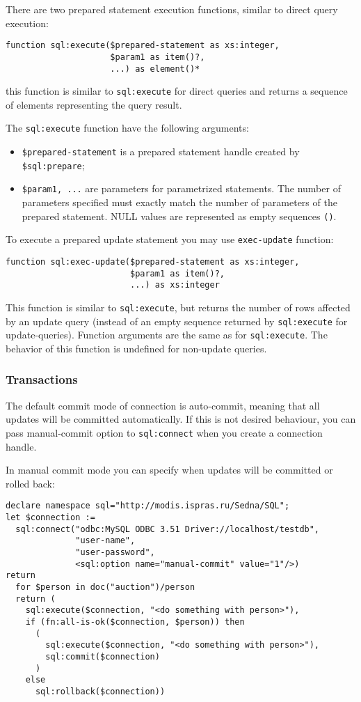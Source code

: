 \documentclass[a4paper,12pt]{article}
\newenvironment{citemize}
{\begin{itemize}
  \setlength{\itemsep}{0pt}
  \setlength{\parskip}{0pt}
  \setlength{\parsep}{0pt}}
{\end{itemize}}
\begin{document}
There are two prepared statement execution functions, similar to direct
query execution:

\begin{verbatim}
function sql:execute($prepared-statement as xs:integer,
                     $param1 as item()?,
                     ...) as element()*
\end{verbatim}
this function is similar to \verb!sql:execute! for direct queries and returns a
sequence of elements representing the query result.

The \verb!sql:execute! function have the following arguments:

\begin{citemize}
\item\verb!$prepared-statement! is a prepared statement handle created by
\verb!$sql:prepare!;
\item\verb!$param1, ...! are parameters for parametrized
statements. The number of parameters specified must exactly match the number
of parameters of the prepared statement. NULL values are represented as empty
sequences \verb!()!.
\end{citemize}

To execute a prepared update statement you may use \verb!exec-update! function:
\begin{verbatim}
function sql:exec-update($prepared-statement as xs:integer,
                         $param1 as item()?,
                         ...) as xs:integer
\end{verbatim}
This function is similar to \verb!sql:execute!, but returns the number of rows
affected by an update query (instead of an empty sequence returned by
\verb!sql:execute! for update-queries). Function arguments are the same as for
\verb!sql:execute!. The behavior of this function is undefined for non-update
queries.


\subsubsection*{Transactions}

The default commit mode of connection is auto-commit, meaning that all updates
will be committed automatically. If this is not desired behaviour, you can pass
manual-commit option to \verb!sql:connect! when you create a connection handle.

In manual commit mode you can specify when updates will be committed or rolled
back:

\small{
\begin{verbatim}
declare namespace sql="http://modis.ispras.ru/Sedna/SQL";
let $connection :=
  sql:connect("odbc:MySQL ODBC 3.51 Driver://localhost/testdb",
              "user-name",
              "user-password",
              <sql:option name="manual-commit" value="1"/>)
return
  for $person in doc("auction")/person
  return (
    sql:execute($connection, "<do something with person>"),
    if (fn:all-is-ok($connection, $person)) then
      (
        sql:execute($connection, "<do something with person>"),
        sql:commit($connection)
      )
    else
      sql:rollback($connection))
\end{verbatim}}
\end{document}
